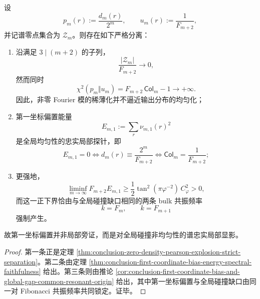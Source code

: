 \begin{theorem}\label{thm:conclusion-zero-sparsity-nonuniformity-localbias-faithfulness}
设
\[
p_m(r):=\frac{d_m(r)}{2^m},
\qquad
u_m(r):=\frac1{F_{m+2}},
\]
并记谱零点集合为 \(\mathcal Z_m\)。则存在如下严格分离：
\begin{enumerate}
  \item 沿满足 \(3\mid(m+2)\) 的子列，
  \[
  \frac{|\mathcal Z_m|}{F_{m+2}}\longrightarrow 0,
  \]
  然而同时
  \[
  \chi^2(p_m\Vert u_m)=F_{m+2}\,\mathsf{Col}_m-1\longrightarrow +\infty.
  \]
  因此，非零 Fourier 模的稀薄化并不逼近输出分布的均匀化；
  \item 第一坐标偏置能量
  \[
  E_{m,1}:=\sum_r \nu_{m,1}(r)^2
  \]
  是全局均匀性的忠实局部探针，即
  \[
  E_{m,1}=0
  \iff
  d_m(r)\equiv \frac{2^m}{F_{m+2}}
  \iff
  \mathsf{Col}_m=\frac1{F_{m+2}};
  \]
  \item 更强地，
  \[
  \liminf_{m\to\infty}F_{m+2}E_{m,1}
  \ge
  \frac12\tan^2(\pi\varphi^{-2})\,C_\varphi^2>0,
  \]
  而这一正下界恰由与全局碰撞缺口相同的两条 bulk 共振频率
  \[
  k=F_m,
  \qquad
  k=F_{m+1}
  \]
  强制产生。
\end{enumerate}
故第一坐标偏置并非局部旁证，而是对全局碰撞非均匀性的谱忠实局部显影。
\end{theorem}
\begin{proof}
第一条正是定理 \ref{thm:conclusion-zero-density-pearson-explosion-strict-separation}。第二条由定理 \ref{thm:conclusion-first-coordinate-bias-energy-spectral-faithfulness} 给出。第三条则由推论 \ref{cor:conclusion-first-coordinate-bias-and-global-gap-common-resonant-origin} 给出，其中第一坐标偏置与全局碰撞缺口由同一对 Fibonacci 共振频率共同锁定。证毕。
\end{proof}

